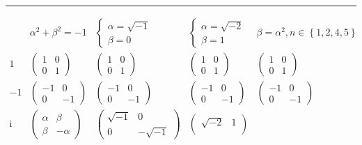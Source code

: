 \documentclass[
]{book}
\theoremstyle{definition}
\theoremstyle{definition}
\theoremstyle{definition}
\theoremstyle{definition}
\theoremstyle{remark}
\begin{document}
\begin{center}\rule{0.5\linewidth}{0.5pt}\end{center}

\[
\begin{array}{ccccc}
 & \alpha^{2}+\beta^{2}=-1 & \begin{cases}
\alpha=\sqrt{-1}\\
\beta=0
\end{cases} & \begin{cases}
\alpha=\sqrt{-2}\\
\beta=1
\end{cases} & \beta=\alpha^{2},n\in\left\{ 1,2,4,5\right\} \\
1 & \begin{pmatrix}1 & 0\\
0 & 1
\end{pmatrix} & \begin{pmatrix}1 & 0\\
0 & 1
\end{pmatrix} & \begin{pmatrix}1 & 0\\
0 & 1
\end{pmatrix} & \begin{pmatrix}1 & 0\\
0 & 1
\end{pmatrix}\\
-1 & \begin{pmatrix}-1 & 0\\
0 & -1
\end{pmatrix} & \begin{pmatrix}-1 & 0\\
0 & -1
\end{pmatrix} & \begin{pmatrix}-1 & 0\\
0 & -1
\end{pmatrix} & \begin{pmatrix}-1 & 0\\
0 & -1
\end{pmatrix}\\
\mathrm{i} & \begin{pmatrix}\alpha & \beta\\
\beta & -\alpha
\end{pmatrix} & \begin{pmatrix}\sqrt{-1} & 0\\
0 & -\sqrt{-1}
\end{pmatrix} & \begin{pmatrix}\sqrt{-2} & 1\\

\end{pmatrix}
\end{array}\]
\end{document}

